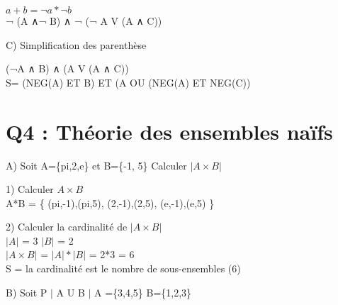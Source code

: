   $a+b = ¬ a * ¬ b$\\

  ¬ (A ∧¬ B) ∧ ¬ (¬ A V (A ∧ C)) \\

\begin{flushleft}
C) Simplification des parenthèse \\
\end{flushleft}

  (¬A ∧ B) ∧ (A V (A ∧ C)) \\

  S= (NEG(A) ET B) ET (A OU (NEG(A) ET NEG(C)) \\


\vspace{10mm} %

\section{Q4 : Théorie des ensembles naïfs}

\vspace{4mm} %

A) Soit A=\{pi,2,e\} et B=\{-1, 5\} Calculer ${|A\times B|}$ \\

\vspace{4mm} %

  1) Calculer ${A\times B}$ \\

  A*B = \{ (pi,-1),(pi,5), (2,-1),(2,5), (e,-1),(e,5) \}

  \vspace{8mm} %

    2) Calculer la cardinalité de ${|A\times B|}$ \\

      ${|A|}$ = 3  ${|B|}$ = 2 \\

      ${|A\times B|}$ = ${|A|}*{|B|}$ = 2*3 = 6 \\

      S = la cardinalité est le nombre de sous-ensembles (6)\\

  \vspace{8mm} %

  B) Soit P $|$ A U B $|$ A =\{3,4,5\} B=\{1,2,3\} \\

  \vspace{5mm} %

